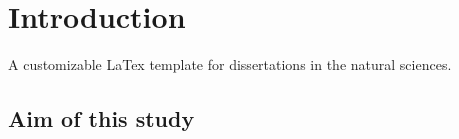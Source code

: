 \section{Introduction}

A customizable LaTex template for dissertations in the natural sciences.\supercite{MScTemplate.2024}




\subsection{Aim of this study}